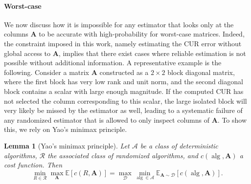 \documentclass[11pt]{article}
\newcommand{\curX}{\mathbf{A}_{\textup{CUR}}}
\newtheorem{lemma}{Lemma}
\begin{document}
\paragraph{Worst-case}
We now discuss how it is impossible for any estimator that looks only at the columns $\mathbf{A}$ to be accurate with high-probability for worst-case matrices.
Indeed, the constraint imposed in this work, namely estimating the CUR error without global access to $\mathbf{A}$, implies that there exist cases where reliable estimation is not possible without additional information.
A representative example is the following.
Consider a matrix $\mathbf{A}$ constructed as a $2 \times 2$ block diagonal matrix,
where the first block has very low rank and unit norm,
and the second diagonal block contains a scalar with large enough magnitude.
If the computed CUR has not selected the column corresponding to this scalar,
the large isolated block will very likely be missed by the estimator as well,
leading to a systematic failure of any randomized estimator that is allowed to only inspect columns of $\mathbf{A}$. To show this, we rely on Yao's minimax principle.
\begin{lemma}[Yao's minimax principle]
    Let $\mathcal{A}$ be a class of deterministic algorithms, $\mathcal{R}$ the associated class of randomized algorithms, and $c(\operatorname{alg},\mathbf{A})$ a cost function. Then
    \begin{equation}
        \min_{R\in\mathcal{R}}\max_{\mathbf{A}}
        \mathbb{E}\left[c(R,\mathbf{A})\right]
        =
        \max_{\mathcal{D}}\min_{\operatorname{alg}\in\mathcal{A}}
        \mathbb{E}_{\mathbf{A}\sim\mathcal{D}}
        \left[c(\operatorname{alg},\mathbf{A})\right].
    \end{equation}
\end{lemma}
\end{document}
